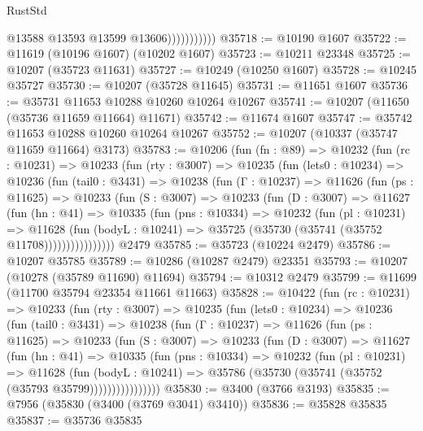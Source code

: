 \begin{lexlean}{RustStd}
\begin{coremodule}
                          @13588
                          @13593
                          @13599
                          @13606)))))))))))
@35718 := @10190 @1607
@35722 := @11619 (@10196 @1607) (@10202 @1607)
@35723 := @10211 @23348
@35725 := @10207 (@35723 @11631)
@35727 := @10249 (@10250 @1607)
@35728 := @10245 @35727
@35730 := @10207 (@35728 @11645)
@35731 := @11651 @1607
@35736 := @35731 @11653 @10288 @10260 @10264 @10267
@35741 := @10207 (@11650 (@35736 @11659 @11664) @11671)
@35742 := @11674 @1607
@35747 := @35742 @11653 @10288 @10260 @10264 @10267
@35752 := @10207 (@10337 (@35747 @11659 @11664) @3173)
@35783 := @10206
    (fun (fn : @89) =>
    @10232
      (fun (rc : @10231) =>
      @10233
        (fun (rty : @3007) =>
        @10235
          (fun (lets0 : @10234) =>
          @10236
            (fun (tail0 : @3431) =>
            @10238
              (fun (Γ : @10237) =>
              @11626
                (fun (ps : @11625) =>
                @10233
                  (fun (S : @3007) =>
                  @10233
                    (fun (D : @3007) =>
                    @11627
                      (fun (hn : @41) =>
                      @10335
                        (fun (pns : @10334) =>
                        @10232
                          (fun (pl : @10231) =>
                          @11628
                            (fun (bodyL : @10241) =>
                            @35725 (@35730 (@35741 (@35752 @11708))))))))))))))))
    @2479
@35785 := @35723 (@10224 @2479)
@35786 := @10207 @35785
@35789 := @10286 (@10287 @2479) @23351
@35793 := @10207 (@10278 (@35789 @11690) @11694)
@35794 := @10312 @2479
@35799 := @11699 (@11700 @35794 @23354 @11661 @11663)
@35828 := @10422
    (fun (rc : @10231) =>
    @10233
      (fun (rty : @3007) =>
      @10235
        (fun (lets0 : @10234) =>
        @10236
          (fun (tail0 : @3431) =>
          @10238
            (fun (Γ : @10237) =>
            @11626
              (fun (ps : @11625) =>
              @10233
                (fun (S : @3007) =>
                @10233
                  (fun (D : @3007) =>
                  @11627
                    (fun (hn : @41) =>
                    @10335
                      (fun (pns : @10334) =>
                      @10232
                        (fun (pl : @10231) =>
                        @11628
                          (fun (bodyL : @10241) =>
                          @35786 (@35730 (@35741 (@35752 (@35793 @35799))))))))))))))))
@35830 := @3400 (@3766 @3193)
@35835 := @7956 (@35830 (@3400 (@3769 @3041) @3410))
@35836 := @35828 @35835
@35837 := @35736 @35835

\end{coremodule}
\end{lexlean}
